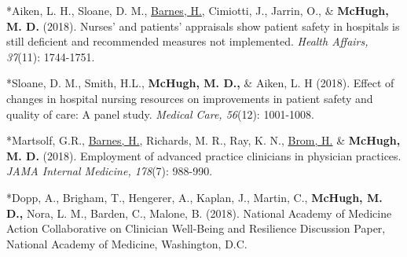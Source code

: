 \documentclass[10pt,]{article}
\begin{document}
{{{{{{{{{{{{{{\begin{hangparas}{.25in}{1}

*Aiken, L. H., Sloane, D. M., {\underline {Barnes, H.}}, Cimiotti, J., Jarrin, O., \& {\textbf {McHugh, M. D.}} (2018). Nurses’ and patients’ appraisals show patient safety in hospitals is still deficient and recommended measures not implemented. {\textit {Health Affairs, 37}}(11): 1744-1751.

\end{hangparas}

\vspace{4mm}

\begin{hangparas}{.25in}{1}

*Sloane, D. M., Smith, H.L., {\textbf {McHugh, M. D.,}} \& Aiken, L. H (2018). Effect of changes in hospital nursing resources on improvements in patient safety and quality of care: A panel study. {\textit {Medical Care, 56}}(12): 1001-1008.

\end{hangparas}

\vspace{4mm}

\begin{hangparas}{.25in}{1}

*Martsolf, G.R., {\underline {Barnes, H.}}, Richards, M. R., Ray, K. N., {\underline {Brom, H.}} \& {\textbf {McHugh, M. D.}} (2018). Employment of advanced practice clinicians in physician practices. {\textit {JAMA Internal Medicine, 178}}(7): 988-990.

\end{hangparas}

\vspace{4mm}

\begin{hangparas}{.25in}{1}

*Dopp, A., Brigham, T., Hengerer, A., Kaplan, J., Martin, C., {\textbf {McHugh, M. D.,}} Nora, L. M., Barden, C., Malone, B. (2018). National Academy of Medicine Action Collaborative on Clinician Well-Being and Resilience Discussion Paper, National Academy of Medicine, Washington, D.C.

\end{hangparas}

\vspace{4mm}

\vspace{4mm}

\begin{hangparas}{.25in}{1}


\end{hangparas}}}}}}}}}}}}}}}
\end{document}
